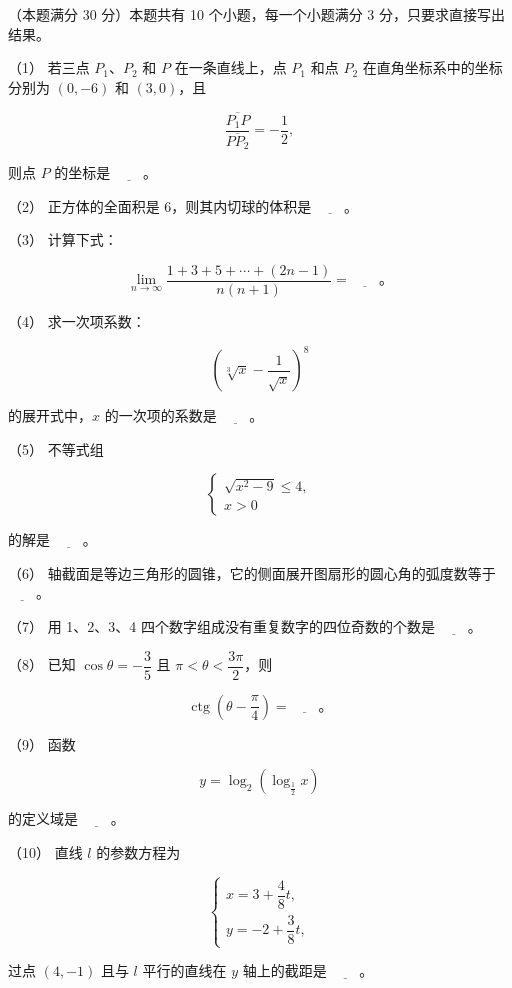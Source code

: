 \begin{question}
（本题满分 30 分）本题共有 10 个小题，每一个小题满分 3 分，只要求直接写出结果。

（1） 若三点 $P_1\text{、}P_2$ 和 $P$ 在一条直线上，点 $P_1$ 和点 $P_2$ 在直角坐标系中的坐标分别为 $(0,-6)$ 和 $(3,0)$，且

\nopagebreak[4]
\[
\frac{\overline{P_1P}}{\overline{PP_2}}=-\frac12,
\]

则点 $P$ 的坐标是 $\underline{\hspace{2em}}$。

（2） 正方体的全面积是 6，则其内切球的体积是 $\underline{\hspace{2em}}$。

（3） 计算下式：

\nopagebreak[4]
\[
\lim_{n\to\infty}\frac{1+3+5+\cdots+(2n-1)}{n(n+1)}
=\underline{\hspace{2em}}\text{。}
\]

（4） 求一次项系数：

\nopagebreak[4]
\[
\left(\sqrt[3]{x}-\frac1{\sqrt{x}}\right)^8
\]

的展开式中，$x$ 的一次项的系数是 $\underline{\hspace{2em}}$。

（5） 不等式组

\nopagebreak[4]
\[
\begin{cases}
\sqrt{x^2-9}\le4,\\
x>0
\end{cases}
\]

的解是 $\underline{\hspace{2em}}$。

（6） 轴截面是等边三角形的圆锥，它的侧面展开图扇形的圆心角的弧度数等于 $\underline{\hspace{2em}}$。

（7） 用 1、2、3、4 四个数字组成没有重复数字的四位奇数的个数是 $\underline{\hspace{2em}}$。

（8） 已知 $\cos\theta=-\dfrac35$ 且 $\pi<\theta<\dfrac{3\pi}2$，则

\nopagebreak[4]
\[
\operatorname{ctg}\left(\theta-\frac\pi4\right)=\underline{\hspace{2em}}\text{。}
\]

（9） 函数

\nopagebreak[4]
\[
y=\log_2\left(\log_{\frac12}x\right)
\]

的定义域是 $\underline{\hspace{2em}}$。

（10） 直线 $l$ 的参数方程为

\nopagebreak[4]
\[
\begin{cases}
x=3+\dfrac48t,\\
y=-2+\dfrac38t,
\end{cases}
\]

过点 $(4,-1)$ 且与 $l$ 平行的直线在 $y$ 轴上的截距是 $\underline{\hspace{2em}}$。

\end{question}
